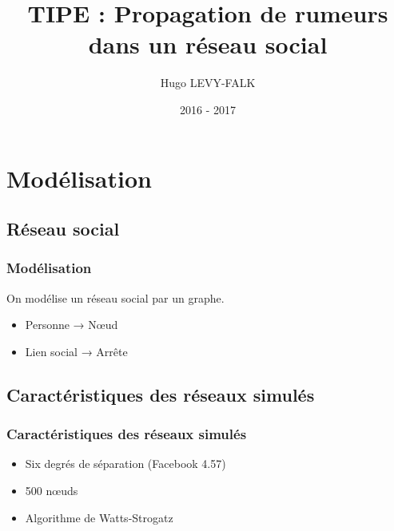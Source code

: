 \documentclass[draft]{beamer}
\title[Propagation de rumeurs dans un réseau social]{TIPE : Propagation de rumeurs dans un réseau social}
\author{Hugo LEVY-FALK}
\date{ 2016 - 2017 }
\begin{document}
\begin{frame}
  \titlepage
\end{frame}

\section{Modélisation}
\subsection{Réseau social}
\begin{frame}
  \frametitle{Modélisation}
  On modélise un réseau social par un graphe.
  \begin{itemize}
    \item<2-> Personne → Nœud
    \item<3-> Lien social → Arrête
  \end{itemize}
\end{frame}
\subsection{Caractéristiques des réseaux simulés}
\begin{frame}
  \frametitle{Caractéristiques des réseaux simulés}
  \begin{itemize}
    \item<2-> Six degrés de séparation (Facebook 4.57) 
    \item<4-> 500 nœuds
    \item<5-> Algorithme de Watts-Strogatz
  \end{itemize}
\end{frame}
\end{document}
